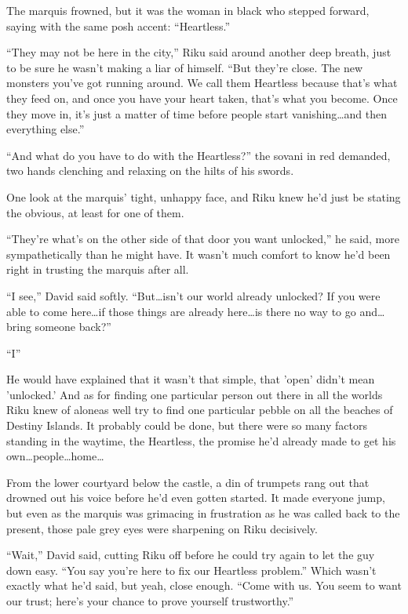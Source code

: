 The marquis frowned, but it was the woman in black who stepped forward, saying with the same posh accent: ``Heartless.''

``They may not be here in the city,'' Riku said around another deep breath, just to be sure he wasn't making a liar of himself. ``But they're close. The new monsters you've got running around. We call them Heartless because that's what they feed on, and once you have your heart taken, that's what you become. Once they move in, it's just a matter of time before people start vanishing\ldots and then everything else.''

``And what do you have to do with the Heartless?'' the sovani in red demanded, two hands clenching and relaxing on the hilts of his swords.

One look at the marquis' tight, unhappy face, and Riku knew he'd just be stating the obvious, at least for one of them.

``They're what's on the other side of that door you want unlocked,'' he said, more sympathetically than he might have. It wasn't much comfort to know he'd been right in trusting the marquis after all.

``I see,'' David said softly. ``But\ldots isn't our world already unlocked? If you were able to come here\ldots if those things are already here\ldots is there no way to go and\ldots bring someone back?''

``I\textemdash ''

He would have explained that it wasn't that simple, that 'open' didn't mean 'unlocked.' And as for finding one particular person out there in all the worlds Riku knew of alone\textemdash as well try to find one particular pebble on all the beaches of Destiny Islands. It probably could be done, but there were so many factors standing in the way\textemdash time, the Heartless, the promise he'd already made to get his own\ldots people\ldots home\ldots 

From the lower courtyard below the castle, a din of trumpets rang out that drowned out his voice before he'd even gotten started. It made everyone jump, but even as the marquis was grimacing in frustration as he was called back to the present, those pale grey eyes were sharpening on Riku decisively.

``Wait,'' David said, cutting Riku off before he could try again to let the guy down easy. ``You say you're here to fix our Heartless problem.'' Which wasn't exactly what he'd said, but yeah, close enough. ``Come with us. You seem to want our trust; here's your chance to prove yourself trustworthy.''

